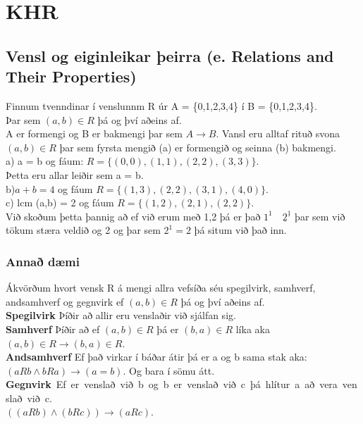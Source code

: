 \section{KHR}
\subsection{Vensl og eiginleikar þeirra (e. Relations and Their Properties)}
Finnum tvenndinar í venslunnm R úr A = \{0,1,2,3,4\} í B = \{0,1,2,3,4\}.\\ 
Þar sem $(a,b) \in R$ þá og því aðeins af.\\
A er formengi og B er bakmengi þar sem $A \rightarrow B$. Vansl eru alltaf rituð svona $(a,b) \in R$ þar sem fyrsta mengið (a) er formengið og seinna (b) bakmengi.\\

a) a = b og fáum: $R = \{(0,0), (1,1),(2,2),(3,3)\}$.\\ \hspace*{2.1em} Þetta eru allar leiðir sem a = b.\\

b)$a + b = 4$ og fáum $R = \{(1,3),(2,2),(3,1),(4,0)\}$.\\

c) lcm (a,b) = 2 og fáum $R = \{(1,2),(2,1),(2,2)\}$.\\ \hspace*{2.1em} Við skoðum þetta þannig að ef við erum með 1,2 þá er það $1^1 \quad \underline{2}^{\underline{1}}$ þar sem \hspace*{2.2em} við tökum stæra veldið og 2 og þar sem $2^1 = 2$ þá situm við það inn.
\subsubsection{Annað dæmi}
Ákvörðum hvort vensk R á mengi allra vefsíða séu spegilvirk, samhverf, andsamhverf og gegnvirk ef $(a,b) \in R$ þá og því aðeins af.\\
\textbf{Spegilvirk} Þíðir að allir eru venslaðir við sjálfan sig.\\
\textbf{Samhverf} Þíðir að ef $(a,b) \in R$ þá er $(b,a) \in R$ líka aka $(a,b) \in R \rightarrow (b,a) \in R$.\\
\textbf{Andsamhverf} Ef það virkar í báðar átir þá er a og b sama stak aka: \\$(aRb \wedge bRa) \rightarrow (a=b)$. Og bara í sömu átt.\\
\hbox{\textbf{Gegnvirk} Ef er venslað við b og b er venslað við c þá hlítur a að vera venslað við c.}\\
$((aRb) \wedge (bRc)) \rightarrow (aRc)$.\\


